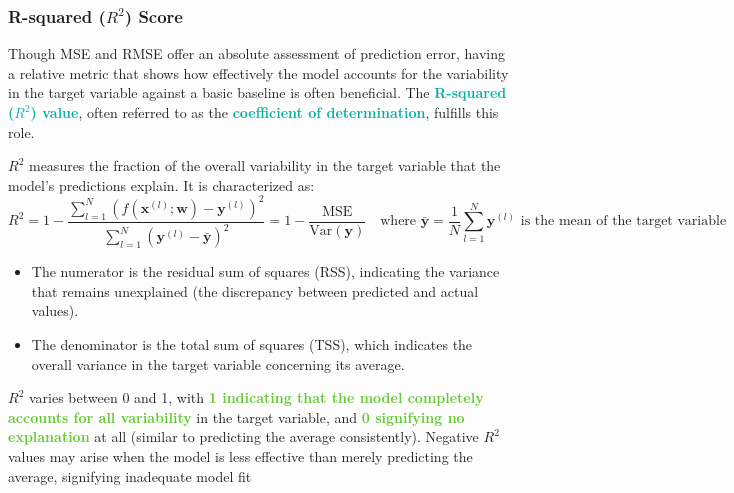 \documentclass[twoside]{article}
\newcommand{\highlightbluetext}[1]{\textcolor[HTML]{09ACA6}{\textbf{#1}}}
\newcommand{\highlightgreentext}[1]{\textcolor[HTML]{62C92F}{\textbf{#1}}}
\numberwithin{equation}{section}
\begin{document}
	\subsubsection{R-squared ($R^2$) Score}
	\label{subsubsec:RSquaredScore}
	Though MSE and RMSE offer an absolute assessment of prediction error, having a relative metric that shows how effectively the model accounts for the variability in the target variable against a basic baseline is often beneficial. The \highlightbluetext{R-squared ($R^2$) value}, often referred to as the \highlightbluetext{coefficient of determination}, fulfills this role.

	$R^2$ measures the fraction of the overall variability in the target variable that the model's predictions explain. It is characterized as:
	\begin{equation}
	\label{eq:RSquaredScoreDefinition}
		\boxed{R^2 = 1 - \frac{\sum_{l = 1}^{N} \left( f(\mathbf{x}^{(l)}; \mathbf{w}) - \mathbf{y}^{(l)} \right)^2}{\sum_{l = 1}^{N} \left( \mathbf{y}^{(l)} - \bar{\mathbf{y}} \right)^2} = 1 - \frac{\text{MSE}}{\text{Var}(\mathbf{y})}} \quad \text{where } \bar{\mathbf{y}} = \frac{1}{N} \sum_{l = 1}^{N} \mathbf{y}^{(l)} \text{ is the mean of the target variable}
	\end{equation}
	\begin{itemize}
		\item The numerator is the residual sum of squares (RSS), indicating the variance that remains unexplained (the discrepancy between predicted and actual values).
		\item The denominator is the total sum of squares (TSS), which indicates the overall variance in the target variable concerning its average.
	\end{itemize}
	$R^2$ varies between 0 and 1, with \highlightgreentext{1 indicating that the model completely accounts for all variability} in the target variable, and \highlightgreentext{0 signifying no explanation} at all (similar to predicting the average consistently). Negative $R^2$ values may arise when the model is less effective than merely predicting the average, signifying inadequate model fit
\end{document}
